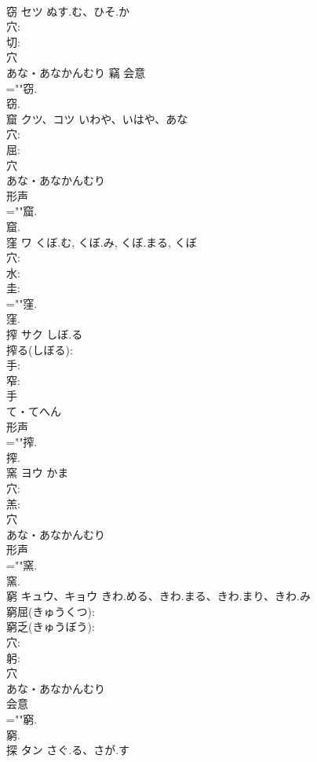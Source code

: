 \documentclass[8pt]{extreport}
\begin{document}
\begin{CJK}{UTF8}{min}
\\	窃	セツ	ぬす.む、ひそ.か		
\\	穴: 
\\	切: 
\\	穴	
\\	あな・あなかんむり	竊	会意 
\\	=""窃.
\\	窃.
\\	窟	クツ、コツ	いわや、いはや、あな		
\\	穴: 
\\	屈: 
\\	穴	
\\	あな・あなかんむり	
\\	形声 
\\	=""窟.
\\	窟.
\\	窪	ワ	くぼ.む, くぼ.み, くぼ.まる, くぼ		
\\	穴: 
\\	水: 
\\	圭: 
\\	=""窪.
\\	窪.
\\	搾	サク	しぼ.る		
\\	搾る(しぼる): 
\\	手: 
\\	窄: 
\\	手	
\\	て・てへん	
\\	形声 
\\	=""搾.
\\	搾.
\\	窯	ヨウ	かま		
\\	穴: 
\\	羔: 
\\	穴	
\\	あな・あなかんむり	
\\	形声 
\\	=""窯.
\\	窯.
\\	窮	キュウ、キョウ	きわ.める、きわ.まる、きわ.まり、きわ.み		
\\	窮屈(きゅうくつ): 
\\	窮乏(きゅうぼう): 
\\	穴: 
\\	躬: 
\\	穴	
\\	あな・あなかんむり	
\\	会意 
\\	=""窮.
\\	窮.
\\	探	タン	さぐ.る、さが.す		

\end{CJK}
\end{document}
